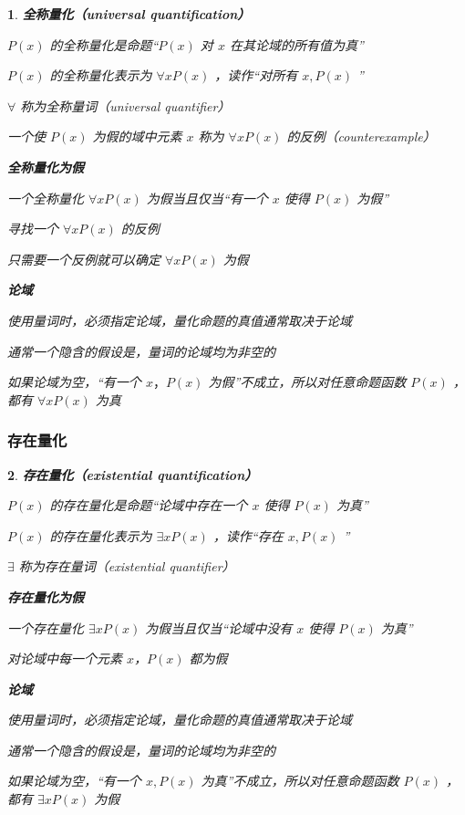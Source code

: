 \documentclass[UTF8]{report}
\theoremstyle{MyLineTheoremStyle} %
\theoremstyle{MyBlockTheoremStyle} %
\theoremstyle{MySubsubsectionStyle} %
\newtheorem{definition}{}
\begin{document}
\begin{definition}
    \textbf{全称量化（universal quantification）}\par
    $P(x)$ 的全称量化是命题“$P(x)$ 对 $x$ 在其论域的所有值为真”\par
    $P(x)$ 的全称量化表示为 $\forall x P(x)$ ，读作“对所有 $x,P(x)$ ”\par
    $\forall$ 称为全称量词（universal quantifier）\par
    一个使 $P(x)$ 为假的域中元素 $x$ 称为 $\forall x P(x)$ 的反例（counterexample）\par

    \textbf{全称量化为假}\par
    一个全称量化 $\forall x P(x)$ 为假当且仅当“有一个 $x$ 使得 $P(x)$ 为假”\par
    寻找一个 $\forall x P(x)$ 的反例\par
    只需要一个反例就可以确定 $\forall x P(x)$ 为假\par

    \textbf{论域}\par
    使用量词时，必须指定论域，量化命题的真值通常取决于论域\par
    通常一个隐含的假设是，量词的论域均为非空的\par
    如果论域为空，“有一个 $x，P(x)$ 为假”不成立，所以对任意命题函数 $P(x)$ ，都有 $\forall x P(x)$ 为真\par
\end{definition}

\subsubsection{存在量化}

\begin{definition}
    \textbf{存在量化（existential quantification）}\par
    $P(x)$ 的存在量化是命题“论域中存在一个 $x$ 使得 $P(x)$ 为真”\par
    $P(x)$ 的存在量化表示为 $\exists x P(x)$ ，读作“存在 $x,P(x)$ ”\par
    $\exists$ 称为存在量词（existential quantifier）\par

    \textbf{存在量化为假}\par
    一个存在量化 $\exists x P(x)$ 为假当且仅当“论域中没有 $x$ 使得 $P(x)$ 为真”\par
    对论域中每一个元素 $x$，$P(x)$ 都为假\par

    \textbf{论域}\par
    使用量词时，必须指定论域，量化命题的真值通常取决于论域\par
    通常一个隐含的假设是，量词的论域均为非空的\par
    如果论域为空，“有一个 $x,P(x)$ 为真”不成立，所以对任意命题函数 $P(x)$ ，都有 $\exists x P(x)$ 为假\par
\end{definition}
\end{document}

